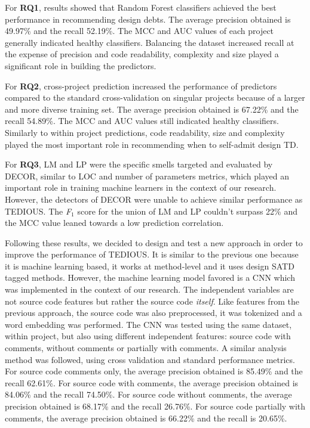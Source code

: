 For \textbf{RQ1}, results showed that Random Forest classifiers achieved the best performance in recommending design debts. The average precision obtained is 49.97\% and the recall 52.19\%. The MCC and AUC values of each project generally indicated healthy classifiers. Balancing the dataset increased recall at the expense of precision and code readability, complexity and size played a significant role in building the predictors. \par

For \textbf{RQ2}, cross-project prediction increased the performance of predictors compared to the standard cross-validation on singular projects because of a larger and more diverse training set. The average precision obtained is 67.22\% and the recall 54.89\%. The MCC and AUC values still indicated healthy classifiers. Similarly to within project predictions, code readability, size and complexity played the most important role in recommending when to self-admit design \ac{TD}. \par

For \textbf{RQ3}, \ac{LM} and \ac{LP} were the specific smells targeted and evaluated by \ac{DECOR}, similar to \ac{LOC} and number of parameters metrics, which played an important role in training machine learners in the context of our research. However, the detectors of \ac{DECOR} were unable to achieve similar performance as \ac{TEDIOUS}. The \emph{F$_{1}$} score for the union of \ac{LM} and \ac{LP} couldn't surpass 22\% and the \ac{MCC} value leaned towards a low prediction correlation. \par

Following these results, we decided to design and test a new approach in order to improve the performance of \ac{TEDIOUS}. It is similar to the previous one because it is machine learning based, it works at method-level and it uses design \ac{SATD} tagged methods. However, the machine learning model favored is a \ac{CNN} which was implemented in the context of our research. The independent variables are not source code features but rather the source code \emph{itself}. Like features from the previous approach, the source code was also preprocessed, it was tokenized and a word embedding was performed. The \ac{CNN} was tested using the same dataset, within project, but also using different independent features: source code with comments, without comments or partially with comments. A similar analysis method was followed, using cross validation and standard performance metrics. For source code comments only, the average precision obtained is 85.49\% and the recall 62.61\%. For source code with comments, the average precision obtained is 84.06\% and the recall 74.50\%. For source code without comments, the average precision obtained is 68.17\% and the recall 26.76\%. For source code partially with comments, the average precision obtained is 66.22\% and the recall is 20.65\%.

